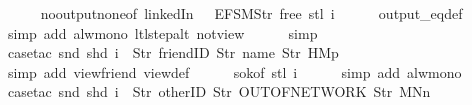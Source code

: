 \begin{isabellebody}
\ \ \ \ \isamarkupfalse%
\ no{\isacharunderscore}output{\isacharunderscore}none{\isacharbrackleft}of\ linkedIn\ {\isachardoublequoteopen}{\isacharparenleft}{\isacharless}{\isachargreater}{\isacharparenleft}{}\ {\isacharcolon}{\isacharequal}\ EFSM{\isachardot}Str\ {\isacharprime}{\isacharprime}free{\isacharprime}{\isacharprime}{\isacharparenright}{\isacharparenright}{\isachardoublequoteclose}\ {\isachardoublequoteopen}{\isacharparenleft}stl\ i{\isacharparenright}{\isachardoublequoteclose}{\isacharbrackright}\isanewline
\ \ \ \ \isamarkupfalse%
\ output_eq{\isacharunderscore}def\isanewline
\ \ \ \ \ \isamarkupfalse%
\ {\isacharparenleft}simp\ add{\isacharcolon}\ alw{\isacharunderscore}mono\ ltl{\isacharunderscore}step{\isacharunderscore}alt\ not{\isacharunderscore}view{\isacharunderscore}{}{\isacharparenright}\isanewline
\ \ \ \ \isamarkupfalse%
\ simp\isanewline
\ \ \ \ \isamarkupfalse%
\ {\isacharparenleft}case{\isacharunderscore}tac\ {\isachardoublequoteopen}{\isacharparenleft}snd\ {\isacharparenleft}shd\ i{\isacharparenright}{\isacharparenright}\ {\isacharequal}\ {\isacharbrackleft}Str\ {\isacharprime}{\isacharprime}friendID{\isacharprime}{\isacharprime}{\isacharcomma}\ Str\ {\isacharprime}{\isacharprime}name{\isacharprime}{\isacharprime}{\isacharcomma}\ Str\ {\isacharprime}{\isacharprime}HM{}p{\isacharprime}{\isacharprime}{\isacharbrackright}{\isachardoublequoteclose}{\isacharparenright}\isanewline
\ \ \ \ \ \isamarkupfalse%
\ {\isacharparenleft}simp\ add{\isacharcolon}\ view{\isacharunderscore}friend\ view{\isacharunderscore}def{\isacharparenright}\isanewline
\ \ \ \ \isamarkupfalse%
\ s{}{\isacharunderscore}ok{\isacharbrackleft}of\ {\isachardoublequoteopen}stl\ i{\isachardoublequoteclose}{\isacharbrackright}\isanewline
\ \ \ \ \isamarkupfalse%
\ {\isacharparenleft}simp\ add{\isacharcolon}\ alw{\isacharunderscore}mono{\isacharparenright}\isanewline
\ \ \ \ \isamarkupfalse%
\ {\isacharparenleft}case{\isacharunderscore}tac\ {\isachardoublequoteopen}{\isacharparenleft}snd\ {\isacharparenleft}shd\ i{\isacharparenright}{\isacharparenright}\ {\isacharequal}\ {\isacharbrackleft}Str\ {\isacharprime}{\isacharprime}otherID{\isacharprime}{\isacharprime}{\isacharcomma}\ Str\ {\isacharprime}{\isacharprime}OUT{\isacharunderscore}OF{\isacharunderscore}NETWORK{\isacharprime}{\isacharprime}{\isacharcomma}\ Str\ {\isacharprime}{\isacharprime}MNn{}{\isacharprime}{\isacharprime}{\isacharbrackright}{\isachardoublequoteclose}{\isacharparenright}\isanewline

\end{isabellebody}
